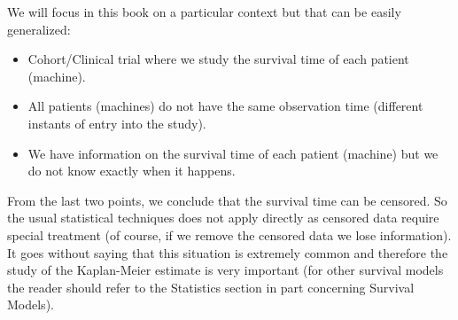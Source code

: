 	We will focus in this book on a particular context but that can be easily generalized:
	\begin{itemize}
		\item Cohort/Clinical trial where we study the survival time of each patient (machine).
		
		\item All patients (machines) do not have the same observation time (different instants of entry into the study).
		
		\item We have information on the survival time of each patient (machine) but we do not know exactly when it happens.
	\end{itemize}
	From the last two points, we conclude that the survival time can be censored. So the usual statistical techniques does not apply directly as censored data require special treatment (of course, if we remove the censored data we lose information). It goes without saying that this situation is extremely common and therefore the study of the Kaplan-Meier estimate is very important (for other survival models the reader should refer to the Statistics section in part concerning Survival Models).
	
